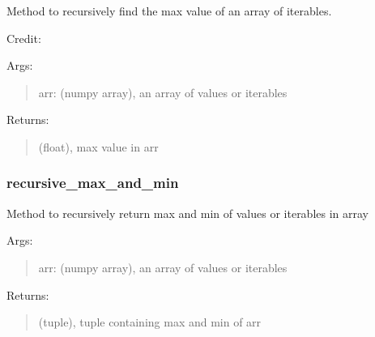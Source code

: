 \documentclass[letterpaper,10pt,english]{sphinxmanual}
\begin{document}
\begin{fulllineitems}
\label{\detokenize{api/mastml.plots.recursive_max:mastml.plots.recursive_max}}
Method to recursively find the max value of an array of iterables.

Credit: 

Args:
\begin{quote}

arr: (numpy array), an array of values or iterables
\end{quote}

Returns:
\begin{quote}

(float), max value in arr
\end{quote}

\end{fulllineitems}



\subsubsection{recursive\_max\_and\_min}
\label{\detokenize{api/mastml.plots.recursive_max_and_min:recursive-max-and-min}}\label{\detokenize{api/mastml.plots.recursive_max_and_min::doc}}

\begin{fulllineitems}
\label{\detokenize{api/mastml.plots.recursive_max_and_min:mastml.plots.recursive_max_and_min}}
Method to recursively return max and min of values or iterables in array

Args:
\begin{quote}

arr: (numpy array), an array of values or iterables
\end{quote}

Returns:
\begin{quote}

(tuple), tuple containing max and min of arr
\end{quote}

\end{fulllineitems}
\end{document}
